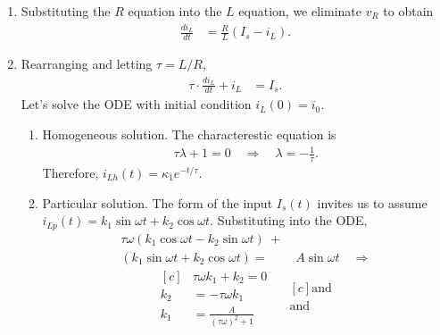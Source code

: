 \documentclass[electronics.tex]{subfiles}
\begin{document}
{\begin{enumerate}
\begin{enumerate}
\begin{tabular}{l|r}
					$\begin{aligned}[t]
						L \\
						R
					\end{aligned}$ &
					$\begin{aligned}[t]
					\frac{d i_L}{d t} &= \frac{1}{L} v_R\\
					v_R &= (I_s - i_L) R
					\end{aligned}$ \\
				\end{tabular}
			\item Substituting the $R$ equation into the $L$ equation, we eliminate $v_R$ to obtain
				\begin{align*}
					\frac{d i_L}{d t} &= \frac{R}{L} \left(I_s - i_L\right).
				\end{align*}
			\item Rearranging and letting $\tau = L/R$, 
				\begin{align*}
					\tau \cdot \frac{d i_L}{d t} + i_L &=  I_s.
				\end{align*}
				Let's solve the ODE with initial condition $i_L(0) = i_0$.
				\begin{enumerate}
					\item Homogeneous solution. The characterestic equation is
					\begin{align*}
						\tau \lambda + 1 = 0 \quad \Rightarrow \quad \lambda = -\frac{1}{\tau}.
					\end{align*}
					Therefore, $i_{Lh}(t) = \kappa_1 e^{-t/\tau}$.
					\item Particular solution. The form of the input $I_s(t)$ invites us to assume $i_{Lp}(t) = k_1 \sin\omega t + k_2 \cos\omega t$. Substituting into the ODE,
					\begin{align*}
						\tau\omega (k_1 \cos\omega t - k_2 \sin\omega t)\ + \\ 
						(k_1 \sin\omega t + k_2 \cos\omega t) =&\ A \sin\omega t \quad \Rightarrow
					\end{align*}
					\begin{equation*}
						\begin{aligned}[c]
							&\tau\omega k_1 + k_2 = 0 \\
							k_2 &= -\tau\omega k_1  \\
							k_1 &= \frac{A}{(\tau\omega)^2+1}
						\end{aligned}
						\quad
						\begin{aligned}[c]
							\text{and} \\
							\text{and} \\

\end{aligned}
\end{equation*}
\end{enumerate}
\end{enumerate}
\end{enumerate}}
\end{document}
